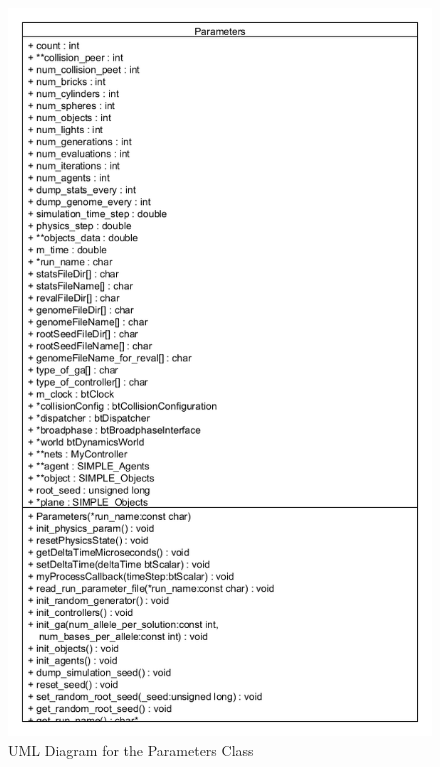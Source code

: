 \begin{figure}[h]
\centering
\includegraphics[scale=0.5]{Chapter2/images/parameters_uml.png}
\caption{UML Diagram for the Parameters Class}
\label{fig:param_uml}
\end{figure}


